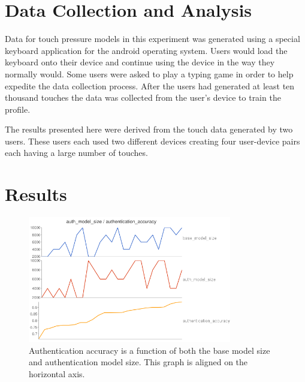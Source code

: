 \documentclass{acm_proc_article-sp}
\begin{document}
\section{Data Collection and Analysis}
\label{sec:data_collection}
Data for touch pressure models in this experiment was generated using a special keyboard application for the android operating system. Users would load the keyboard onto their device and continue using the device in the way they normally would. Some users were asked to play a typing game in order to help expedite the data collection process. After the users had generated at least ten thousand touches the data was collected from the user's device to train the profile.

The results presented here were derived from the touch data generated by two users. These users each used two different devices creating four user-device pairs each having a large number of touches.



\section{Results}
\label{sec:results}

\begin{figure}
\centering
\includegraphics[width=3.5in]{authentication_accuracy_vs_model_size.png}
\caption{Authentication accuracy is a function of
both the base model size and authentication model size.
This graph is aligned on the horizontal axis.}
\label{fig:authentication_accuracy}
\end{figure}
\end{document}
